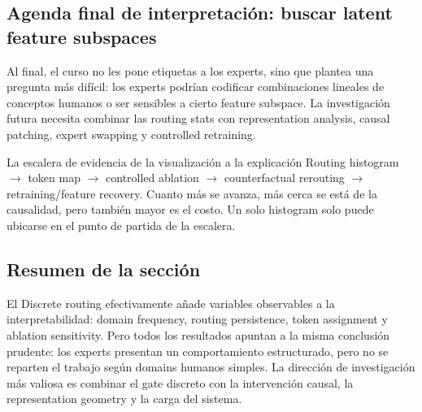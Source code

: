 
\subsection{Agenda final de interpretación: buscar latent feature subspaces}

Al final, el curso no les pone etiquetas a los experts, sino que plantea una pregunta más difícil: los experts podrían codificar combinaciones lineales de conceptos humanos o ser sensibles a cierto feature subspace. La investigación futura necesita combinar las routing stats con representation analysis, causal patching, expert swapping y controlled retraining.


\begin{importantbox}{La escalera de evidencia de la visualización a la explicación}
Routing histogram $\rightarrow$ token map $\rightarrow$ controlled ablation $\rightarrow$ counterfactual rerouting $\rightarrow$ retraining/feature recovery. Cuanto más se avanza, más cerca se está de la causalidad, pero también mayor es el costo. Un solo histogram solo puede ubicarse en el punto de partida de la escalera.
\end{importantbox}


\subsection{Resumen de la sección}

El Discrete routing efectivamente añade variables observables a la interpretabilidad: domain frequency, routing persistence, token assignment y ablation sensitivity. Pero todos los resultados apuntan a la misma conclusión prudente: los experts presentan un comportamiento estructurado, pero no se reparten el trabajo según domains humanos simples. La dirección de investigación más valiosa es combinar el gate discreto con la intervención causal, la representation geometry y la carga del sistema.
